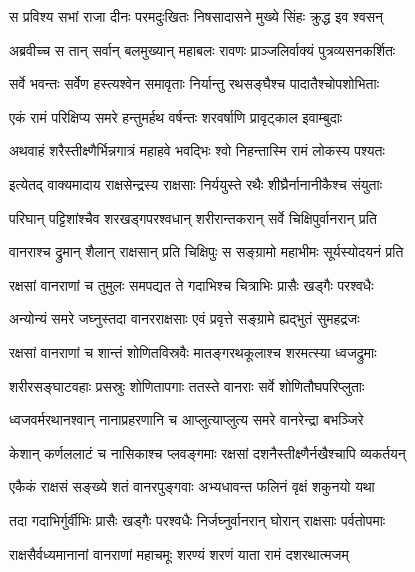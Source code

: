 
\twolineshloka
{स प्रविश्य सभां राजा दीनः परमदुःखितः}
{निषसादासने मुख्ये सिंहः क्रुद्ध इव श्वसन्} %

\twolineshloka
{अब्रवीच्च स तान् सर्वान् बलमुख्यान् महाबलः}
{रावणः प्राञ्जलिर्वाक्यं पुत्रव्यसनकर्शितः} %

\twolineshloka
{सर्वे भवन्तः सर्वेण हस्त्यश्वेन समावृताः}
{निर्यान्तु रथसङ्घैश्च पादातैश्चोपशोभिताः} %

\twolineshloka
{एकं रामं परिक्षिप्य समरे हन्तुमर्हथ}
{वर्षन्तः शरवर्षाणि प्रावृट्काल इवाम्बुदाः} %

\twolineshloka
{अथवाहं शरैस्तीक्ष्णैर्भिन्नगात्रं महाहवे}
{भवद्भिः श्वो निहन्तास्मि रामं लोकस्य पश्यतः} %

\twolineshloka
{इत्येतद् वाक्यमादाय राक्षसेन्द्रस्य राक्षसाः}
{निर्ययुस्ते रथैः शीघ्रैर्नानानीकैश्च संयुताः} %

\twolineshloka
{परिघान् पट्टिशांश्चैव शरखड्गपरश्वधान्}
{शरीरान्तकरान् सर्वे चिक्षिपुर्वानरान् प्रति} %

\twolineshloka
{वानराश्च द्रुमान् शैलान् राक्षसान् प्रति चिक्षिपुः}
{स सङ्ग्रामो महाभीमः सूर्यस्योदयनं प्रति} %

\twolineshloka
{रक्षसां वानराणां च तुमुलः समपद्यत}
{ते गदाभिश्च चित्राभिः प्रासैः खड्गैः परश्वधैः} %

\twolineshloka
{अन्योन्यं समरे जघ्नुस्तदा वानरराक्षसाः}
{एवं प्रवृत्ते सङ्ग्रामे ह्यद्भुतं सुमहद्रजः} %

\twolineshloka
{रक्षसां वानराणां च शान्तं शोणितविस्रवैः}
{मातङ्गरथकूलाश्च शरमत्स्या ध्वजद्रुमाः} %

\twolineshloka
{शरीरसङ्घाटवहाः प्रसस्रुः शोणितापगाः}
{ततस्ते वानराः सर्वे शोणितौघपरिप्लुताः} %

\twolineshloka
{ध्वजवर्मरथानश्वान् नानाप्रहरणानि च}
{आप्लुत्याप्लुत्य समरे वानरेन्द्रा बभञ्जिरे} %

\twolineshloka
{केशान् कर्णललाटं च नासिकाश्च प्लवङ्गमाः}
{रक्षसां दशनैस्तीक्ष्णैर्नखैश्चापि व्यकर्तयन्} %

\twolineshloka
{एकैकं राक्षसं सङ्ख्ये शतं वानरपुङ्गवाः}
{अभ्यधावन्त फलिनं वृक्षं शकुनयो यथा} %

\twolineshloka
{तदा गदाभिर्गुर्वीभिः प्रासैः खड्गैः परश्वधैः}
{निर्जघ्नुर्वानरान् घोरान् राक्षसाः पर्वतोपमाः} %

\twolineshloka
{राक्षसैर्वध्यमानानां वानराणां महाचमूः}
{शरण्यं शरणं याता रामं दशरथात्मजम्} %

